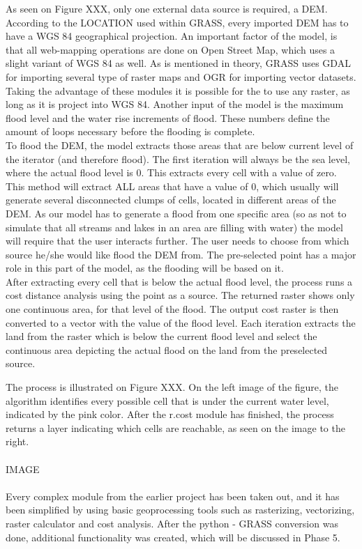 As seen on Figure XXX, only one external data source is required, a DEM. According to the LOCATION used within GRASS, every imported DEM has to have a WGS 84 geographical projection. An important factor of the model, is that all web-mapping operations are done on Open Street Map, which uses a slight variant of WGS 84 as well. As is mentioned in theory, GRASS uses GDAL for importing several type of raster maps and OGR for importing vector datasets. Taking the advantage of these modules it is possible for the to use any raster, as long as it is project into WGS 84. Another input of the model is the maximum flood level and the water rise increments of flood. These numbers define the amount of loops necessary before the flooding is complete.\\
To flood the DEM, the model extracts those areas that are below current level of the iterator (and therefore flood). The first iteration will always be the sea level, where the actual flood level is 0. This extracts every cell with a value of zero. \\
This method will extract ALL areas that have a value of 0, which usually will generate several disconnected clumps of cells, located in different areas of the DEM. As our model has to generate a flood from one specific area (so as not to simulate that all streams and lakes in an area are filling with water) the model will require that the user interacts further. The user needs to choose from which source he/she would like flood the DEM from. The pre-selected point has a major role in this part of the model, as the flooding will be based on it. \\

After extracting every cell that is below the actual flood level, the process runs a cost distance analysis using the point as a source. The returned raster shows only one continuous area, for that level of the flood. The output cost raster is then converted to a vector with the value of the flood level. Each iteration extracts the land from the raster which is below the current flood level and select the continuous area depicting the actual flood on the land from the preselected source. 

The process is illustrated on Figure XXX. On the left image of the figure, the algorithm identifies every possible cell that is under the current water level, indicated by the pink color. After the r.cost module has finished, the process returns a layer indicating which cells are reachable, as seen on the image to the right.\\
\\
IMAGE\\
\\
Every complex module from the earlier project has been taken out, and it has been simplified by using basic geoprocessing tools such as rasterizing, vectorizing, raster calculator and cost analysis. After the python - GRASS conversion was done, additional functionality was created, which will be discussed in Phase 5.

